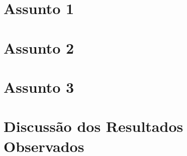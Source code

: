 \section{Assunto 1}
\lipsum[3-5]

\section{Assunto 2}
\lipsum[3-5]

\section{Assunto 3}
\lipsum[3-5]

\section{Discussão dos Resultados Observados}
\lipsum[3-5]





